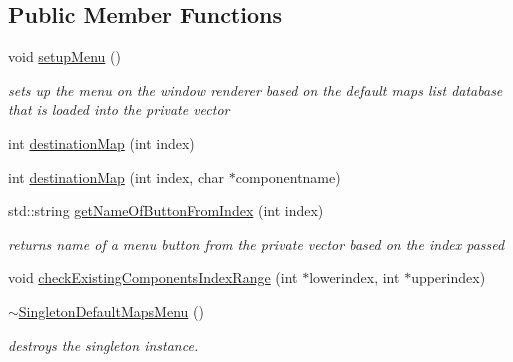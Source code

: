 \subsection*{Public Member Functions}
\begin{DoxyCompactItemize}
\item 
\hypertarget{class_singleton_default_maps_menu_a59fde691685554eb029a3271909ca90e}{}\label{class_singleton_default_maps_menu_a59fde691685554eb029a3271909ca90e} 
void \hyperlink{class_singleton_default_maps_menu_a59fde691685554eb029a3271909ca90e}{setup\+Menu} ()
\begin{DoxyCompactList}\small\item\em sets up the menu on the window renderer based on the default maps list database that is loaded into the private vector \end{DoxyCompactList}\item 
int \hyperlink{class_singleton_default_maps_menu_ae1fbaf884313cf1efe755f480c505062}{destination\+Map} (int index)
\item 
int \hyperlink{class_singleton_default_maps_menu_ae72d52564efb81a41fe9f2ee648fe691}{destination\+Map} (int index, char $\ast$componentname)
\item 
\hypertarget{class_singleton_default_maps_menu_aa022a1b779121764e471c67d9d461d6d}{}\label{class_singleton_default_maps_menu_aa022a1b779121764e471c67d9d461d6d} 
std\+::string \hyperlink{class_singleton_default_maps_menu_aa022a1b779121764e471c67d9d461d6d}{get\+Name\+Of\+Button\+From\+Index} (int index)
\begin{DoxyCompactList}\small\item\em returns name of a menu button from the private vector based on the index passed \end{DoxyCompactList}\item 
void \hyperlink{class_singleton_default_maps_menu_aa8c2183626eac2346c15259a4c9a5093}{check\+Existing\+Components\+Index\+Range} (int $\ast$lowerindex, int $\ast$upperindex)
\item 
\hypertarget{class_singleton_default_maps_menu_a468a928711b450b932afc49c3c70239c}{}\label{class_singleton_default_maps_menu_a468a928711b450b932afc49c3c70239c} 
\hyperlink{class_singleton_default_maps_menu_a468a928711b450b932afc49c3c70239c}{$\sim$\+Singleton\+Default\+Maps\+Menu} ()
\begin{DoxyCompactList}\small\item\em destroys the singleton instance. \end{DoxyCompactList}\end{DoxyCompactItemize}
